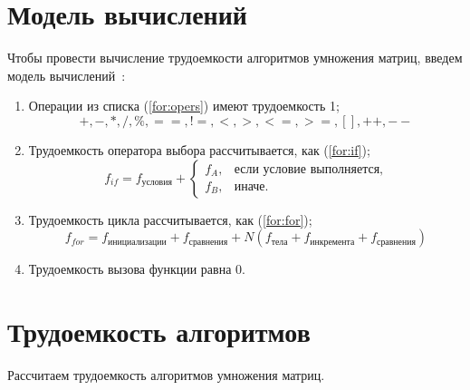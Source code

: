 
\clearpage


\section{Модель вычислений}

Чтобы провести вычисление трудоемкости алгоритмов умножения матриц, введем модель вычислений~\cite{model}:

\begin{enumerate}
	\item Операции из списка (\ref{for:opers}) имеют трудоемкость 1;
	\begin{equation}
		\label{for:opers}
		+, -, *, /, \%, ==, !=, <, >, <=, >=, [], ++, {-}-
	\end{equation}
	\item Трудоемкость оператора выбора  рассчитывается, как (\ref{for:if});
	\begin{equation}
		\label{for:if}
		f_{if} = f_{\text{условия}} +
		\begin{cases}
			f_A, & \text{если условие выполняется,}\\
			f_B, & \text{иначе.}
		\end{cases}
	\end{equation}
	\item Трудоемкость цикла рассчитывается, как (\ref{for:for});
	\begin{equation}
		\label{for:for}
		f_{for} = f_{\text{инициализации}} + f_{\text{сравнения}} + N(f_{\text{тела}} + f_{\text{инкремента}} + f_{\text{сравнения}})
	\end{equation}
	\item Трудоемкость вызова функции равна 0.
\end{enumerate}


\section{Трудоемкость алгоритмов}

Рассчитаем трудоемкость алгоритмов умножения матриц.
\clearpage


